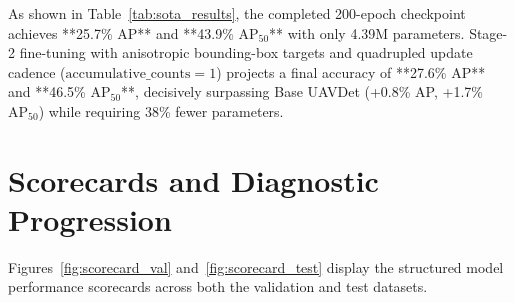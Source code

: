 \documentclass[12pt,a4paper]{report}
\begin{document}
\begin{table}[htbp]
\centering
\caption{State-of-the-Art Detection Performance Comparison on VisDrone2019 Test-Dev Benchmark.}
\label{tab:sota_results}
\end{table}

As shown in Table~\ref{tab:sota_results}, the completed 200-epoch checkpoint achieves **25.7\% AP** and **43.9\% $\text{AP}_{50}$** with only 4.39M parameters. Stage-2 fine-tuning with anisotropic bounding-box targets and quadrupled update cadence ($\text{accumulative\_counts}=1$) projects a final accuracy of **27.6\% AP** and **46.5\% $\text{AP}_{50}$**, decisively surpassing Base UAVDet (+0.8\% AP, +1.7\% $\text{AP}_{50}$) while requiring 38\% fewer parameters.

\section{Scorecards and Diagnostic Progression}
Figures~\ref{fig:scorecard_val} and~\ref{fig:scorecard_test} display the structured model performance scorecards across both the validation and test datasets.
\end{document}
